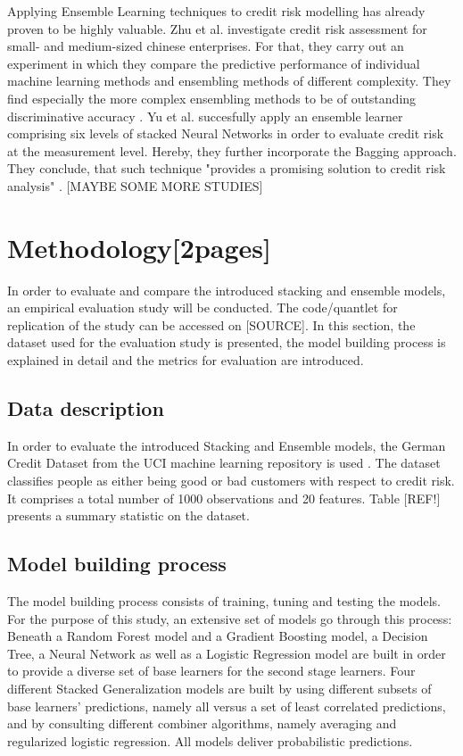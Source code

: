 \documentclass[12pt]{article}
\begin{document}
Applying Ensemble Learning techniques to credit risk modelling has already proven to be highly valuable. Zhu et al. \citeyear{zhu2017comparison} investigate credit risk assessment for small- and medium-sized chinese enterprises. For that, they carry out an experiment in which they compare the predictive performance of individual machine learning methods and ensembling methods of different complexity. They find especially the more complex ensembling methods to be of outstanding discriminative accuracy \citep[p.46f.]{zhu2017comparison}. Yu et al. \citeyear{yu2008credit} succesfully apply an ensemble learner comprising six levels of stacked Neural Networks in order to evaluate credit risk at the measurement level. Hereby, they further incorporate the Bagging approach. They conclude, that such technique "provides a promising solution to credit risk analysis" \citep[p.1443]{yu2008credit}. [MAYBE SOME MORE STUDIES]




\section{Methodology[2pages]}
In order to evaluate and compare the introduced stacking and ensemble models, an empirical evaluation study will be conducted. The code/quantlet for replication of the study can be accessed on [SOURCE]. In this section, the dataset used for the evaluation study is presented, the model building process is explained in detail and the metrics for evaluation are introduced.
\subsection{Data description}
In order to evaluate the introduced Stacking and Ensemble models, the German Credit Dataset from the UCI machine learning repository is used \citep{dataset}. The dataset classifies people as either being good or bad customers with respect to credit risk. It comprises a total number of 1000 observations and 20 features. Table [REF!] presents a summary statistic on the dataset.

\subsection{Model building process}
The model building process consists of training, tuning and testing the models. For the purpose of this study, an extensive set
of models go through this process: Beneath a Random Forest model and a Gradient Boosting model, a Decision Tree, a Neural Network as well as a Logistic Regression model are built in order to provide a diverse set of base learners for the second stage learners. Four different Stacked Generalization models are built by using different subsets of base learners' predictions, namely all versus a set of least correlated predictions, and by consulting different combiner algorithms, namely averaging and regularized logistic regression. All models deliver probabilistic predictions. 
\end{document}
